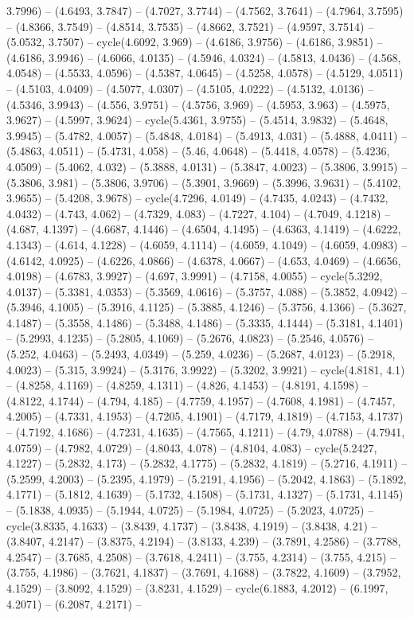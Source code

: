3.7996) -- (4.6493, 3.7847) -- (4.7027, 3.7744) -- (4.7562, 3.7641) -- (4.7964, 3.7595) -- (4.8366, 3.7549) -- (4.8514, 3.7535) -- (4.8662, 3.7521) -- (4.9597, 3.7514) -- (5.0532, 3.7507) -- cycle(4.6092, 3.969) -- (4.6186, 3.9756) -- (4.6186, 3.9851) -- (4.6186, 3.9946) -- (4.6066, 4.0135) -- (4.5946, 4.0324) -- (4.5813, 4.0436) -- (4.568, 4.0548) -- (4.5533, 4.0596) -- (4.5387, 4.0645) -- (4.5258, 4.0578) -- (4.5129, 4.0511) -- (4.5103, 4.0409) -- (4.5077, 4.0307) -- (4.5105, 4.0222) -- (4.5132, 4.0136) -- (4.5346, 3.9943) -- (4.556, 3.9751) -- (4.5756, 3.969) -- (4.5953, 3.963) -- (4.5975, 3.9627) -- (4.5997, 3.9624) -- cycle(5.4361, 3.9755) -- (5.4514, 3.9832) -- (5.4648, 3.9945) -- (5.4782, 4.0057) -- (5.4848, 4.0184) -- (5.4913, 4.031) -- (5.4888, 4.0411) -- (5.4863, 4.0511) -- (5.4731, 4.058) -- (5.46, 4.0648) -- (5.4418, 4.0578) -- (5.4236, 4.0509) -- (5.4062, 4.032) -- (5.3888, 4.0131) -- (5.3847, 4.0023) -- (5.3806, 3.9915) -- (5.3806, 3.981) -- (5.3806, 3.9706) -- (5.3901, 3.9669) -- (5.3996, 3.9631) -- (5.4102, 3.9655) -- (5.4208, 3.9678) -- cycle(4.7296, 4.0149) -- (4.7435, 4.0243) -- (4.7432, 4.0432) -- (4.743, 4.062) -- (4.7329, 4.083) -- (4.7227, 4.104) -- (4.7049, 4.1218) -- (4.687, 4.1397) -- (4.6687, 4.1446) -- (4.6504, 4.1495) -- (4.6363, 4.1419) -- (4.6222, 4.1343) -- (4.614, 4.1228) -- (4.6059, 4.1114) -- (4.6059, 4.1049) -- (4.6059, 4.0983) -- (4.6142, 4.0925) -- (4.6226, 4.0866) -- (4.6378, 4.0667) -- (4.653, 4.0469) -- (4.6656, 4.0198) -- (4.6783, 3.9927) -- (4.697, 3.9991) -- (4.7158, 4.0055) -- cycle(5.3292, 4.0137) -- (5.3381, 4.0353) -- (5.3569, 4.0616) -- (5.3757, 4.088) -- (5.3852, 4.0942) -- (5.3946, 4.1005) -- (5.3916, 4.1125) -- (5.3885, 4.1246) -- (5.3756, 4.1366) -- (5.3627, 4.1487) -- (5.3558, 4.1486) -- (5.3488, 4.1486) -- (5.3335, 4.1444) -- (5.3181, 4.1401) -- (5.2993, 4.1235) -- (5.2805, 4.1069) -- (5.2676, 4.0823) -- (5.2546, 4.0576) -- (5.252, 4.0463) -- (5.2493, 4.0349) -- (5.259, 4.0236) -- (5.2687, 4.0123) -- (5.2918, 4.0023) -- (5.315, 3.9924) -- (5.3176, 3.9922) -- (5.3202, 3.9921) -- cycle(4.8181, 4.1) -- (4.8258, 4.1169) -- (4.8259, 4.1311) -- (4.826, 4.1453) -- (4.8191, 4.1598) -- (4.8122, 4.1744) -- (4.794, 4.185) -- (4.7759, 4.1957) -- (4.7608, 4.1981) -- (4.7457, 4.2005) -- (4.7331, 4.1953) -- (4.7205, 4.1901) -- (4.7179, 4.1819) -- (4.7153, 4.1737) -- (4.7192, 4.1686) -- (4.7231, 4.1635) -- (4.7565, 4.1211) -- (4.79, 4.0788) -- (4.7941, 4.0759) -- (4.7982, 4.0729) -- (4.8043, 4.078) -- (4.8104, 4.083) -- cycle(5.2427, 4.1227) -- (5.2832, 4.173) -- (5.2832, 4.1775) -- (5.2832, 4.1819) -- (5.2716, 4.1911) -- (5.2599, 4.2003) -- (5.2395, 4.1979) -- (5.2191, 4.1956) -- (5.2042, 4.1863) -- (5.1892, 4.1771) -- (5.1812, 4.1639) -- (5.1732, 4.1508) -- (5.1731, 4.1327) -- (5.1731, 4.1145) -- (5.1838, 4.0935) -- (5.1944, 4.0725) -- (5.1984, 4.0725) -- (5.2023, 4.0725) -- cycle(3.8335, 4.1633) -- (3.8439, 4.1737) -- (3.8438, 4.1919) -- (3.8438, 4.21) -- (3.8407, 4.2147) -- (3.8375, 4.2194) -- (3.8133, 4.239) -- (3.7891, 4.2586) -- (3.7788, 4.2547) -- (3.7685, 4.2508) -- (3.7618, 4.2411) -- (3.755, 4.2314) -- (3.755, 4.215) -- (3.755, 4.1986) -- (3.7621, 4.1837) -- (3.7691, 4.1688) -- (3.7822, 4.1609) -- (3.7952, 4.1529) -- (3.8092, 4.1529) -- (3.8231, 4.1529) -- cycle(6.1883, 4.2012) -- (6.1997, 4.2071) -- (6.2087, 4.2171) -- 